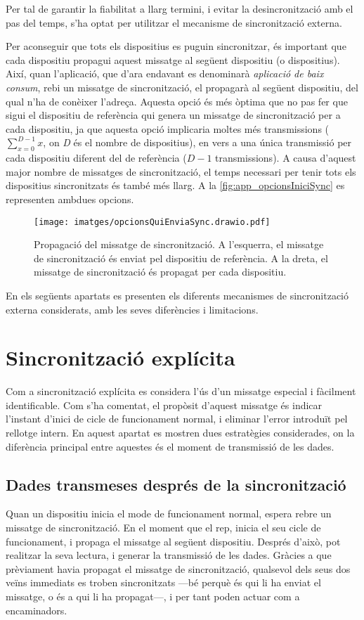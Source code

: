 \documentclass{tfgitic}[2024/07/01]
\begin{document}
{Per tal de garantir la fiabilitat a llarg termini, i evitar la desincronització amb el pas del temps, s'ha optat per utilitzar el mecanisme de sincronització externa. 

Per aconseguir que tots els dispositius es puguin sincronitzar, és important que cada dispositiu propagui aquest missatge al següent dispositiu (o dispositius). Així, quan l'aplicació, que d'ara endavant es denominarà \emph{aplicació de baix consum}, rebi un missatge de sincronització, el propagarà al següent dispositiu, del qual n'ha de conèixer l'adreça. Aquesta opció és més òptima que no pas fer que sigui el dispositiu de referència qui genera un missatge de sincronització per a cada dispositiu, ja que aquesta opció implicaria moltes més transmissions ($\sum_{x=0}^{D-1}{x}$, on \emph{D} és el nombre de dispositius), en vers a una única transmissió per cada dispositiu diferent del de referència ($D-1$ transmissions). A causa d'aquest major nombre de missatges de sincronització, el temps necessari per tenir tots els dispositius sincronitzats és també més llarg. A la \autoref{fig:app_opcionsIniciSync} es representen ambdues opcions.

\begin{figure}
    \centering
    \texttt{[image: imatges/opcionsQuiEnviaSync.drawio.pdf]}
    \caption{Propagació del missatge de sincronització. A l'esquerra, el missatge de sincronització és enviat pel dispositiu de referència. A la dreta, el missatge de sincronització és propagat per cada dispositiu.}
\label{fig:app_opcionsIniciSync}
\end{figure}

En els següents apartats es presenten els diferents mecanismes de sincronització externa considerats, amb les seves diferències i limitacions.

\section{Sincronització explícita}
Com a sincronització explícita es considera l'ús d'un missatge especial i fàcilment identificable. Com s'ha comentat, el propòsit d'aquest missatge és indicar l'instant d'inici de cicle de funcionament normal, i eliminar l'error introduït pel rellotge intern. En aquest apartat es mostren dues estratègies considerades, on la diferència principal entre aquestes és el moment de transmissió de les dades.

\subsection{Dades transmeses després de la sincronització}
Quan un dispositiu inicia el mode de funcionament normal, espera rebre un missatge de sincronització. En el moment que el rep, inicia el seu cicle de funcionament, i propaga el missatge al següent dispositiu. Després d'això, pot realitzar la seva lectura, i generar la transmissió de les dades. Gràcies a que prèviament havia propagat el missatge de sincronització, qualsevol dels seus dos veïns immediats es troben sincronitzats ---bé perquè és qui li ha enviat el missatge, o és a qui li ha propagat---, i per tant poden actuar com a encaminadors.

}
\end{document}
